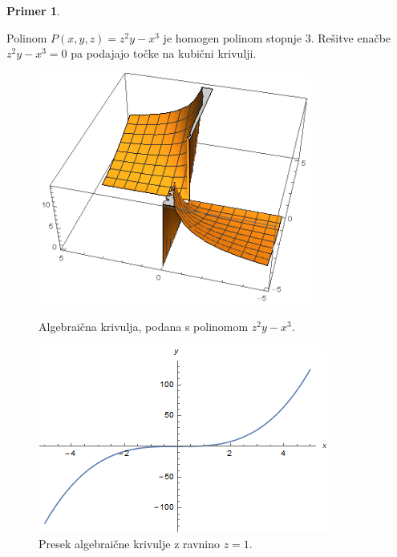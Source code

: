 \documentclass[12pt,a4paper,twoside]{article}
\theoremstyle{definition} %
\newtheorem{primer}[definicija]{Primer}
\theoremstyle{plain} %
\numberwithin{equation}{section}  %
\begin{document}
\begin{primer}~

Polinom $P(x,y,z) = z^2y-x^3$ je homogen polinom stopnje $3$. Rešitve enačbe $z^2y-x^3 = 0$ pa podajajo točke na kubični krivulji.
\\


\begin{figure}[ht]
  \centering
\begin{minipage}{.5\textwidth}
  \includegraphics[width=0.8\textwidth]{images/krivulja.png}
  \caption[Primer algebraične krivulje.]{Algebraična krivulja, podana s polinomom $z^2y-x^3$.}
  \label{fig:krivulja}
\end{minipage}%
\begin{minipage}{.5\textwidth}
\centering
\includegraphics[scale=0.5]{images/projektivnaz.png}
\caption[Presek algebraične krivulje z ravnino $z=1$.]{Presek algebraične krivulje z ravnino $z=1$.}
\label{fig:projektivnaz}
\end{minipage}
\end{figure}



\end{primer}
\end{document}
